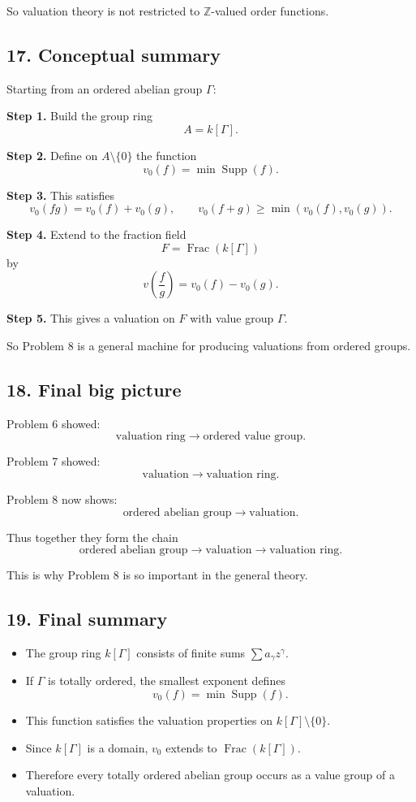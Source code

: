 \documentclass[12pt,a4paper]{article}
\theoremstyle{notespace}
\DeclareMathOperator{\Supp}{Supp}
\DeclareMathOperator{\Frac}{Frac}
\begin{document}
So valuation theory is not restricted to \(\mathbb Z\)-valued order functions.

\subsection{17. Conceptual summary}

Starting from an ordered abelian group \(\Gamma\):

\textbf{Step 1.}
Build the group ring
\[
A=k[\Gamma].
\]

\textbf{Step 2.}
Define on \(A\setminus\{0\}\) the function
\[
v_0(f)=\min\Supp(f).
\]

\textbf{Step 3.}
This satisfies
\[
v_0(fg)=v_0(f)+v_0(g),
\qquad
v_0(f+g)\ge \min(v_0(f),v_0(g)).
\]

\textbf{Step 4.}
Extend to the fraction field
\[
F=\Frac(k[\Gamma])
\]
by
\[
v\!\left(\frac{f}{g}\right)=v_0(f)-v_0(g).
\]

\textbf{Step 5.}
This gives a valuation on \(F\) with value group \(\Gamma\).

So Problem 8 is a general machine for producing valuations from ordered groups.

\subsection{18. Final big picture}

Problem 6 showed:
\[
\text{valuation ring}
\longrightarrow
\text{ordered value group}.
\]

Problem 7 showed:
\[
\text{valuation}
\longrightarrow
\text{valuation ring}.
\]

Problem 8 now shows:
\[
\text{ordered abelian group}
\longrightarrow
\text{valuation}.
\]

Thus together they form the chain
\[
\text{ordered abelian group}
\longrightarrow
\text{valuation}
\longrightarrow
\text{valuation ring}.
\]

This is why Problem 8 is so important in the general theory.

\subsection{19. Final summary}

\begin{itemize}
	\item The group ring \(k[\Gamma]\) consists of finite sums \(\sum a_\gamma z^\gamma\).
	\item If \(\Gamma\) is totally ordered, the smallest exponent defines
	\[
	v_0(f)=\min\Supp(f).
	\]
	\item This function satisfies the valuation properties on \(k[\Gamma]\setminus\{0\}\).
	\item Since \(k[\Gamma]\) is a domain, \(v_0\) extends to \(\Frac(k[\Gamma])\).
	\item Therefore every totally ordered abelian group occurs as a value group of a valuation.
\end{itemize}	
	
\end{document}
